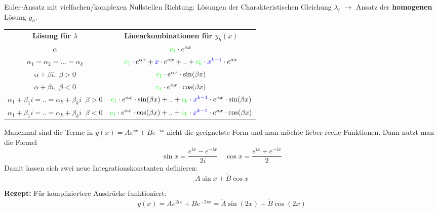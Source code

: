 \begin{Rezept}{Euler-Ansatz mit vielfachen/komplexen Nullstellen}{}
	Richtung: Lösungen der Charakteristischen Gleichung $\lambda_i$ $\to$ Ansatz der \textbf{homogenen} Lösung $y_h$.\\

    \begin{tabular}{c|c}
         \textbf{Lösung für $\lambda$} & \textbf{Linearkombinationen für $y_h(x)$}\\
         $\alpha$ & ${\color{green}c_1} \cdot e^{\alpha x}$\\
         $\alpha_1 = \alpha_2 = \ldots = \alpha_k$ & ${\color{green}c_1} \cdot e^{\alpha x} + {\color{blue} x} \cdot e^{\alpha x} + .. + {\color{green}c_k} \cdot {\color{blue} x^{k-1}} \cdot e^{\alpha x}$\\
         $\alpha + \beta i, \; \beta>0$ & ${\color{green}c_1} \cdot e^{\alpha x} \cdot \sin(\beta x)$\\
         $\alpha + \beta i, \; \beta<0$ & ${\color{green}c_1} \cdot e^{\alpha x} \cdot \cos(\beta x)$\\
         $\alpha_1 + \beta_1 i = .. = \alpha_k + \beta_k i \;\; \beta>0$ & ${\color{green}c_1} \cdot e^{\alpha x} \cdot \sin(\beta x) + .. + {\color{green}c_k} \cdot {\color{blue} x^{k-1}} \cdot e^{\alpha x} \cdot \sin(\beta x)$\\
         $\alpha_1 + \beta_1 i = .. = \alpha_k + \beta_k i \;\; \beta<0$ & ${\color{green}c_1} \cdot e^{\alpha x} \cdot \cos(\beta x) + .. + {\color{green}c_k} \cdot {\color{blue} x^{k-1}} \cdot e^{\alpha x} \cdot \cos(\beta x)$\\
    \end{tabular}
\end{Rezept}

\begin{Diverses}{}{}
	Manchmal sind die Terme in $y(x) = Ae^{ix} + Be^{-ix}$ nicht die geeignetste Form und man möchte lieber reelle Funktionen. Dann nutzt man die Formel 
	\[
		\sin x = \frac{e^{ix} - e^{-ix}}{2i} \quad
    	\cos x = \frac{e^{ix} + e^{-ix}}{2}
    \]
	Damit lassen sich zwei neue Integrationskonstanten definieren: \[\widetilde{A} \sin x + \widetilde{B} \cos x\]
	
	\textbf{Rezept:} Für kompliziertere Ausdrücke funktioniert:
	\[
	    y(x) = Ae^{2ix} + Be^{-2ix} = \widetilde{A} \sin (2x) + \widetilde{B} \cos (2x)
	\]
\end{Diverses}

